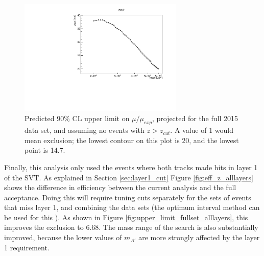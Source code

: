 \begin{figure}[ht]
\begin{center}
    \includegraphics[width=0.7\textwidth,page=15,angle=-90]{vertexing/figs/golden_fullset_mres_nosignal_output}
\end{center}
\caption{Predicted 90\% CL upper limit on $\mu/\mu_{exp}$, projected for the full 2015 data set, and assuming no events with $z>z_{cut}$. A value of 1 would mean exclusion; the lowest contour on this plot is 20, and the lowest point is 14.7.}
    \label{fig:upper_limit_fullset}
\end{figure}

Finally, this analysis only used the events where both tracks made hits in layer 1 of the SVT.
As explained in Section \ref{sec:layer1_cut}
Figure \ref{fig:eff_z_alllayers} shows the difference in efficiency between the current analysis and the full acceptance.
Doing this will require tuning cuts separately for the sets of events that miss layer 1, and combining the data sets (the optimum interval method can be used for this \cite{yellin_ways_2011}).
As shown in Figure \ref{fig:upper_limit_fullset_alllayers}, this improves the exclusion to 6.68.
The mass range of the search is also substantially improved, because the lower values of $m_{A'}$ are more strongly affected by the layer 1 requirement.


